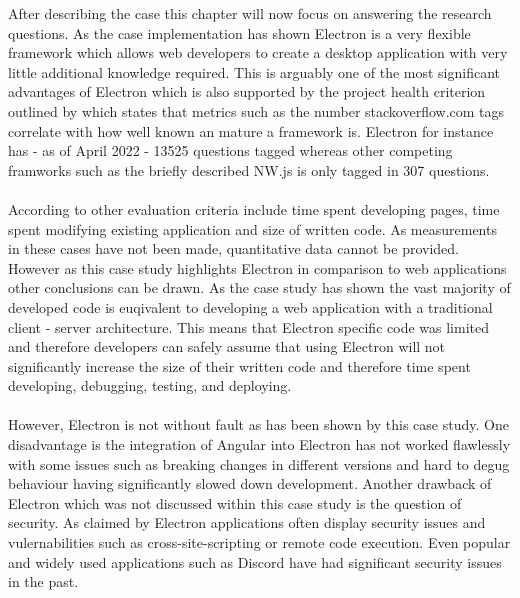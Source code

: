 
After describing the case this chapter will now focus on answering the research questions.
As the case implementation has shown Electron is a very flexible framework 
which allows web developers to create a desktop application with very little 
additional knowledge required. 
This is arguably one of the most significant advantages of Electron which is 
also supported by the project health criterion outlined by \textcite{ratingsFW} 
which states that metrics such as the number stackoverflow.com tags correlate 
with how well known an mature a framework is. \parencite{backEndComparison}
Electron for instance has - as of April 2022 - 13525 questions tagged whereas
other competing framworks such as the briefly described NW.js is only tagged 
in 307 questions.\paragraph{}
According to \textcite{frameworksEfficiency} other evaluation criteria include
time spent developing pages, time spent modifying existing application and size
of written code. 
As measurements in these cases have not been made, quantitative data cannot 
be provided. 
However as this case study highlights Electron in comparison to web applications
other conclusions can be drawn.
As the case study has shown the vast majority of developed code is euqivalent to 
developing a web application with a traditional client - server architecture. 
This means that Electron specific code was limited and therefore developers can 
safely assume that using Electron will not significantly increase the size of 
their written code and therefore time spent developing, debugging, testing, and
deploying. \paragraph{}
However, Electron is not without fault as has been shown by this case study.
One disadvantage is the integration of Angular into Electron has not worked flawlessly 
with some issues such as breaking changes in different versions and hard to 
degug behaviour having significantly slowed down development. 
Another drawback of Electron which was not discussed within this case study 
is the question of security. 
As claimed by \textcite{frameworksSecurity} Electron applications often display 
security issues and vulernabilities such as cross-site-scripting or remote code execution.
Even popular and widely used applications such as Discord have had significant 
security issues in the past. \parencite{discordVulernabilities}\paragraph{}
